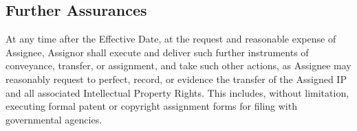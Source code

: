 \subsection{Further Assurances}
At any time after the Effective Date, at the request and reasonable expense of Assignee, Assignor shall execute and deliver such further instruments of conveyance, transfer, or assignment, and take such other actions, as Assignee may reasonably request to perfect, record, or evidence the transfer of the Assigned IP and all associated Intellectual Property Rights. This includes, without limitation, executing formal patent or copyright assignment forms for filing with governmental agencies.
